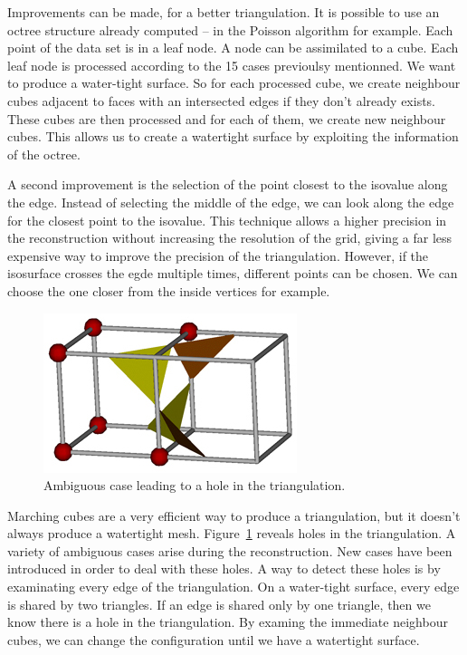 \documentclass[12pt]{article}
\begin{document}
Improvements can be made, for a better triangulation. It is possible to use an octree structure already computed -- in the Poisson algorithm for example. Each point of the data set is in a leaf node. A node can be assimilated to a cube. Each leaf node is processed according to the 15 cases previoulsy mentionned. We want to produce a water-tight surface. So for each processed cube, we create neighbour cubes adjacent to faces with an intersected edges if they don't already exists. These cubes are then processed and for each of them, we create new neighbour cubes. This allows us to create a watertight surface by exploiting the information of the octree.

A second improvement is the selection of the point closest to the isovalue along the edge. Instead of selecting the middle of the edge, we can look along the edge for the closest point to the isovalue. This technique allows a higher precision in the reconstruction without increasing the resolution of the grid, giving a far less expensive way to improve the precision of the triangulation. However, if the isosurface crosses the egde multiple times, different points can be chosen. We can choose the one closer from the inside vertices for example.

\begin{figure}[h]
  \centering
  \includegraphics[scale=0.7]{ambiguousMC.jpg}
  \caption{\label{ambig} Ambiguous case leading to a hole in the triangulation.
}
\end{figure}

Marching cubes are a very efficient way to produce a triangulation, but it doesn't always produce a watertight mesh. Figure~\ref{ambig} reveals holes in the triangulation. A variety of ambiguous cases arise during the reconstruction. New cases have been introduced in order to deal with these holes. A way to detect these holes is by examinating every edge of the triangulation. On a water-tight surface, every edge is shared by two triangles. If an edge is shared only by one triangle, then we know there is a hole in the triangulation. By examing the immediate neighbour cubes, we can change the configuration until we have a watertight surface.
\end{document}
